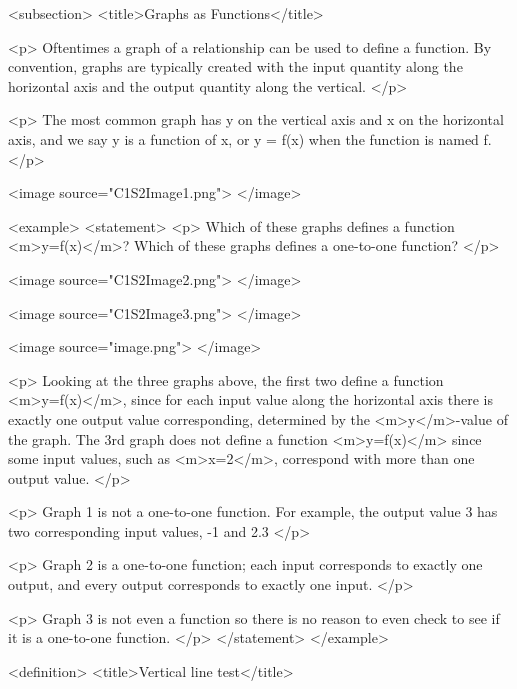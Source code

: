     <subsection>
        <title>Graphs as Functions</title>

        <p>
            Oftentimes a graph of a relationship can be used to define a function.
            By convention, graphs are typically created with the input quantity along the horizontal axis and the output quantity along the vertical.
        </p>

        <p>
            The most common graph has y on the vertical axis and x on the horizontal axis, and we say y is a function of x, or y = f(x) when the function is named f.
        </p>

        <image source="C1S2Image1.png">
        </image>

        <example>
            <statement>
                <p>
                    Which of these graphs defines a function <m>y=f(x)</m>? Which of these graphs defines a one-to-one function?
                </p>

                <image source="C1S2Image2.png">
                </image>

                <image source="C1S2Image3.png">
                </image>

                <image source="image.png">
                </image>

                <p>
                    Looking at the three graphs above, the first two define a function <m>y=f(x)</m>, since for each input value along the horizontal axis there is exactly one output value corresponding, determined by the <m>y</m>-value of the graph.
                    The 3rd graph does not define a function <m>y=f(x)</m> since some input values, such as <m>x=2</m>, correspond with more than one output value.
                </p>

                <p>
                    Graph 1 is not a one-to-one function.
                    For example, the output value 3 has two corresponding input values, -1 and 2.3
                </p>

                <p>
                    Graph 2 is a one-to-one function; each input corresponds to exactly one output, and every output corresponds to exactly one input.
                </p>

                <p>
                    Graph 3 is not even a function so there is no reason to even check to see if it is a one-to-one function.
                </p>
            </statement>
        </example>

        <definition>
            <title>Vertical line test</title>

